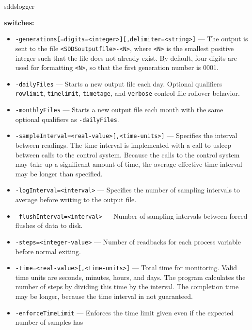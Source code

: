 \begin{sddsprog}{sddslogger}
%
\item {\bf switches:}
%
%
    \begin{itemize}
%
%
        \item {\verb+-generations[=digits=<integer>][,delimiter=<string>]+} ---
                The output is sent to the file \verb+<SDDSoutputfile>-<N>+, where \verb+<N>+ is
                the smallest positive integer such that the file does not already
                exist.  By default, four digits are used for formatting \verb+<N>+, so that
                the first generation number is 0001.
        \item {\tt -dailyFiles} --- Starts a new output file each day. Optional qualifiers
                \verb+rowlimit+, \verb+timelimit+, \verb+timetage+, and \verb+verbose+ control
                file rollover behavior.
        \item {\tt -monthlyFiles} --- Starts a new output file each month with the same optional
                qualifiers as \verb+-dailyFiles+.
        \item {\tt -sampleInterval=<real-value>[,<time-units>]} --- Specifies the interval between readings. The time
                interval is implemented with a call to usleep between calls to the control system.
                Because the calls to the control system may take up a significant amount of time, the average
                effective time interval may be longer than specified. 
        \item {\tt -logInterval=<interval>} --- Specifies the number of sampling intervals to average before
                writing to the output file.
        \item {\tt -flushInterval=<interval>} --- Number of sampling intervals between forced flushes of data to disk.
        \item {\tt -steps=<integer-value>} --- Number of readbacks for each process variable before normal exiting.
        \item {\tt -time=<real-value>[,<time-units>]} --- Total time for monitoring. Valid time units are
                seconds, minutes, hours, and days. The program calculates the number of steps by dividing this time
                by the interval. The completion time may be longer, because the time interval in not guaranteed.
        \item {\tt -enforceTimeLimit} --- Enforces the time limit given even if the expected number of samples has

\end{itemize}
\end{sddsprog}
